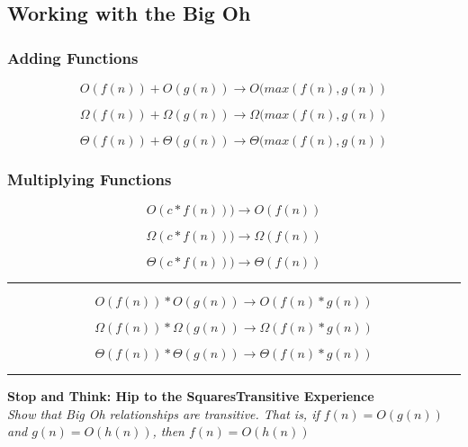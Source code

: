 \subsection{Working with the Big Oh}

\subsubsection{Adding Functions}

$$O(f(n)) + O(g(n)) \longrightarrow O(max(f(n),g(n))$$

$$\Omega(f(n)) + \Omega(g(n)) \longrightarrow \Omega(max(f(n),g(n))$$


$$\Theta(f(n)) + \Theta(g(n)) \longrightarrow \Theta(max(f(n),g(n))$$

\subsubsection{Multiplying Functions}

$$O(c*f(n))) \longrightarrow O(f(n))$$

$$\Omega(c*f(n))) \longrightarrow \Omega(f(n))$$


$$\Theta(c*f(n))) \longrightarrow \Theta(f(n))$$

\noindent\rule{\textwidth}{0.4pt}

$$O(f(n)) * O(g(n)) \longrightarrow O(f(n) * g(n))$$

$$\Omega(f(n)) * \Omega(g(n)) \longrightarrow \Omega(f(n) * g(n))$$

$$\Theta(f(n)) * \Theta(g(n)) \longrightarrow \Theta(f(n) * g(n))$$

\noindent\rule{\textwidth}{0.4pt}

\textbf{Stop and Think: Hip to the SquaresTransitive Experience} \\

\emph{Show that Big Oh relationships are transitive. That is, if $f(n) = O(g(n))$ and $g(n) = O(h(n))$, then $f(n) = O(h(n))$}